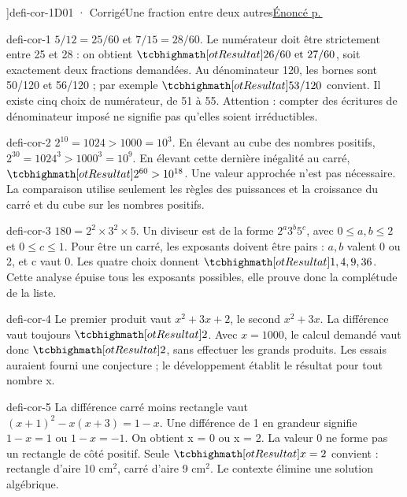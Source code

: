 \editionPage[\pdfbookmark[0]{Corrigés des défis}{bm-defi-cor-1-parent}]{defi-cor-1}{D01 · Corrigé}{Une fraction entre deux autres}{\hyperref[defi-ex-1]{Énoncé p.\,\pageref*{defi-ex-1}}}
\begin{blocEdition}{defi-cor-1}
$5/12=25/60$ et $7/15=28/60$. Le numérateur doit être strictement entre 25 et 28 : on obtient $\res{26/60\text{ et }27/60}$, soit exactement deux fractions demandées. Au dénominateur 120, les bornes sont 50/120 et 56/120 ; par exemple $\res{53/120}$ convient. Il existe cinq choix de numérateur, de 51 à 55. Attention : compter des écritures de dénominateur imposé ne signifie pas qu’elles soient irréductibles.
\end{blocEdition}
\begin{blocEdition}{defi-cor-2}
$2^{10}=1024>1000=10^3$. En élevant au cube des nombres positifs, $2^{30}=1024^3>1000^3=10^9$. En élevant cette dernière inégalité au carré, $\res{2^{60}>10^{18}}$. Une valeur approchée n’est pas nécessaire. La comparaison utilise seulement les règles des puissances et la croissance du carré et du cube sur les nombres positifs.
\end{blocEdition}
\begin{blocEdition}{defi-cor-3}
$180=2^2\times3^2\times5$. Un diviseur est de la forme $2^a3^b5^c$, avec $0\le a,b\le2$ et $0\le c\le1$. Pour être un carré, les exposants doivent être pairs : $a,b$ valent 0 ou 2, et c vaut 0. Les quatre choix donnent $\res{1,4,9,36}$. Cette analyse épuise tous les exposants possibles, elle prouve donc la complétude de la liste.
\end{blocEdition}
\begin{blocEdition}{defi-cor-4}
Le premier produit vaut $x^2+3x+2$, le second $x^2+3x$. La différence vaut toujours $\res2$. Avec $x=1000$, le calcul demandé vaut donc $\res2$, sans effectuer les grands produits. Les essais auraient fourni une conjecture ; le développement établit le résultat pour tout nombre x.
\end{blocEdition}
\begin{blocEdition}{defi-cor-5}
La différence carré moins rectangle vaut $(x+1)^2-x(x+3)=1-x$. Une différence de 1 en grandeur signifie $1-x=1$ ou $1-x=-1$. On obtient x = 0 ou x = 2. La valeur 0 ne forme pas un rectangle de côté positif. Seule $\res{x=2}$ convient : rectangle d’aire 10 cm$^2$, carré d’aire 9 cm$^2$. Le contexte élimine une solution algébrique.
\end{blocEdition}
